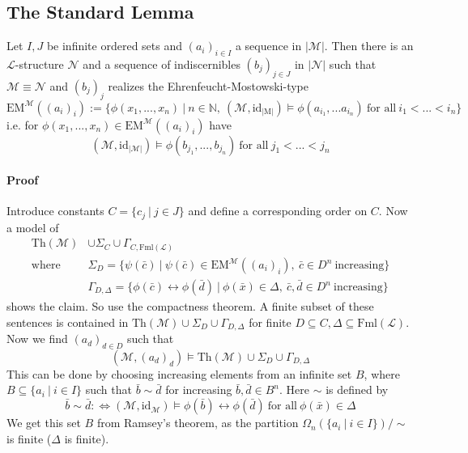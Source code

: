 \documentclass{scrartcl}
\newcommand{\N}{\mathbb{N}}
\begin{document}
\subsection{The Standard Lemma}
\label{standard_lemma}
Let $I, J$ be infinite ordered sets and $(a_i)_{i \in I}$ a sequence in $|\mathcal{M}|$.
Then there is an $\mathcal{L}$-structure $\mathcal{N}$ and a sequence of indiscernibles $(b_j)_{j \in J}$ in $|\mathcal{N}|$ such that $\mathcal{M} \equiv \mathcal{N}$ and $(b_j)_j$ realizes the Ehrenfeucht-Mostowski-type
\begin{equation*}
    \mathrm{EM}^{\mathcal{M}}((a_i)_i) := \{ \phi(x_1, ..., x_n) \ | \ n \in \N, \ (\mathcal{M}, \mathrm{id}_{|\mathrm{M}|}) \models \phi(a_{i_1}, ... a_{i_n}) \ \text{for all} \ i_1 < ... < i_n \}
\end{equation*}
i.e. for $\phi(x_1, ..., x_n) \in \mathrm{EM}^{\mathcal{M}}((a_i)_i)$ have
\begin{equation*}
    (\mathcal{M}, \mathrm{id}_{|\mathcal{M}|}) \models \phi(b_{j_1}, ..., b_{j_n}) \ \text{for all} \ j_1 < ... < j_n
\end{equation*}
\paragraph{Proof} Introduce constants $C = \{ c_j \ | \ j \in J \}$ and define a corresponding order on $C$.
Now a model of
\begin{align*}
    \mathrm{Th}(\mathcal{M})& \cup \Sigma_C \cup \Gamma_{C, \mathrm{Fml}(\mathcal{L})} \\
    \text{where} \ &\Sigma_D = \{ \psi(\bar{c}) \ | \ \psi(\bar{c}) \in \mathrm{EM}^{\mathcal{M}}((a_i)_i), \ \bar{c} \in D^n \ \text{increasing} \} \\
    &\Gamma_{D, \Delta} = \{ \phi(\bar{c}) \leftrightarrow \phi(\bar{d}) \ | \ \phi(\bar{x}) \in \Delta, \ \bar{c}, \bar{d} \in D^n \ \text{increasing} \}
\end{align*}
shows the claim. So use the compactness theorem. 
A finite subset of these sentences is contained in $\mathrm{Th}(\mathcal{M}) \cup \Sigma_D \cup \Gamma_{D, \Delta}$ for finite $D \subseteq C, \Delta \subseteq \mathrm{Fml}(\mathcal{L})$.
Now we find $(a_d)_{d \in D}$ such that
\begin{equation*}
    (\mathcal{M}, (a_d)_d) \models \mathrm{Th}(\mathcal{M}) \cup \Sigma_D \cup \Gamma_{D, \Delta}
\end{equation*}
This can be done by choosing increasing elements from an infinite set $B$, where $B \subseteq \{ a_i \ | \ i \in I \}$ such that $\bar{b} \sim \bar{d}$ for increasing $\bar{b}, \bar{d} \in B^n$.
Here $\sim$ is defined by
\begin{equation*}
    \bar{b} \sim \bar{d} :\Leftrightarrow (\mathcal{M}, \mathrm{id}_{\mathcal{M}}) \models \phi(\bar{b}) \leftrightarrow \phi(\bar{d}) \ \text{for all} \ \phi(\bar{x}) \in \Delta
\end{equation*}
We get this set $B$ from Ramsey's theorem, as the partition $\Omega_n(\{ a_i \ | \ i \in I \})/\sim$ is finite ($\Delta$ is finite).
\end{document}

